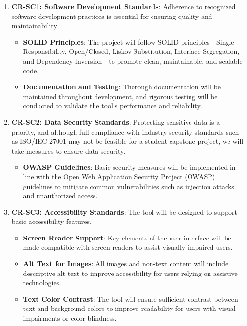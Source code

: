 \documentclass[12pt]{article}
\begin{document}
\begin{enumerate}
    \item \textbf{CR-SC1: Software Development Standards}: Adherence to recognized software development practices is essential for ensuring quality and maintainability.
        \begin{itemize}
            \item \textbf{SOLID Principles}: The project will follow SOLID principles—Single Responsibility, 
            Open/Closed, Liskov Substitution, Interface Segregation, and Dependency Inversion—to promote clean,
             maintainable, and scalable code.
            \item \textbf{Documentation and Testing}: Thorough documentation will be maintained throughout 
            development, and rigorous testing will be conducted to validate the tool's performance and reliability.
        \end{itemize}



    \item \textbf{CR-SC2: Data Security Standards}: Protecting sensitive data is a priority, and although full 
    compliance with industry security standards such as ISO/IEC 27001 may not be feasible for a student 
    capstone project, we will take measures to ensure data security.
        \begin{itemize}
            \item \textbf{OWASP Guidelines}: Basic security measures will be implemented in line with the 
            Open Web Application Security Project (OWASP) guidelines to mitigate common vulnerabilities such 
            as injection attacks and unauthorized access.
        \end{itemize}


    \item \textbf{CR-SC3: Accessibility Standards}: The tool will be designed to support basic accessibility features.
    \begin{itemize}
        \item \textbf{Screen Reader Support}: Key elements of the user interface will be made compatible with 
        screen readers to assist visually impaired users.
        \item \textbf{Alt Text for Images}: All images and non-text content will include descriptive alt text to 
        improve accessibility for users relying on assistive technologies.
        \item \textbf{Text Color Contrast}: The tool will ensure sufficient contrast between text and background 
        colors to improve readability for users with visual impairments or color blindness.
    \end{itemize}
        


\end{enumerate}
\end{document}
